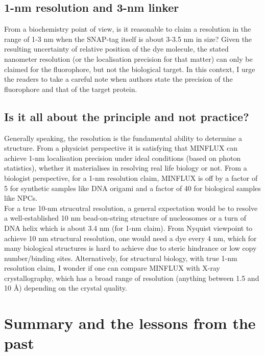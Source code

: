 \documentclass[9pt,twocolumn,twoside]{pnas-new}
\begin{document}
\subsection{1-nm resolution and 3-nm linker}
From a biochemistry point of view, is it reasonable to claim a resolution in the range of 1-3 nm when the SNAP-tag itself is about 3-3.5 nm in size? Given the resulting uncertainty of relative position of the dye molecule, the stated nanometer resolution (or the localisation precision for that matter) can only be claimed for the fluorophore, but not the biological target. In this context, I urge the readers to take a careful note when authors state the precision of the fluorophore and that of the target protein. 
 
\subsection{Is it all about the principle and not practice?}
Generally speaking, the resolution is the fundamental ability to determine a structure. From a physicist perspective it is satisfying that MINFLUX can achieve 1-nm localisation precision under ideal conditions (based on photon statistics), whether it materialises in resolving real life biology or not. 
From a biologist perspective, for a 1-nm resolution claim, MINFLUX is off by a factor of 5 for synthetic samples like DNA origami and a factor of 40 for biological samples like NPCs. \\
For a true 10-nm strucutral resolution, a general expectation would be to resolve a well-established 10 nm bead-on-string structure of nucleosomes or a turn of DNA helix which is about 3.4 nm (for 1-nm claim). From Nyquist viewpoint to achieve 10 nm structural resolution, one would need a dye every 4 nm, which for many biological structures is hard to achieve due to steric hindrance or low copy number/binding sites. Alternatively, for structural biology, with true 1-nm resolution claim, I wonder if one can compare MINFLUX with X-ray crystallography, which has a broad range of resolution (anything between 1.5 and 10 Å) depending on the crystal quality.



\section{Summary and the lessons from the past}
\end{document}
